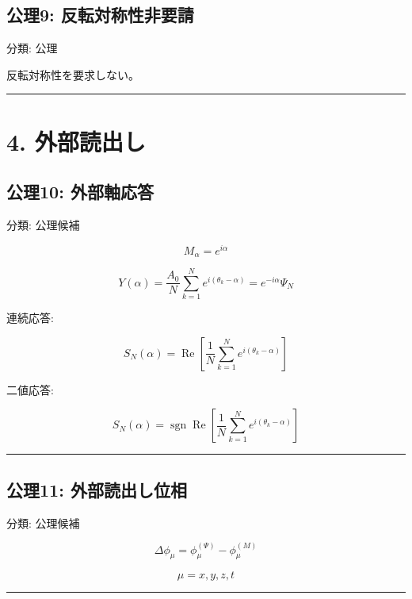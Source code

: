 \documentclass[
  a4paper,
]{ltjsarticle}
\begin{document}
\subsection{公理9:
反転対称性非要請}\label{ux516cux74069-ux53cdux8ee2ux5bfeux79f0ux6027ux975eux8981ux8acb}

分類: 公理

反転対称性を要求しない。

\begin{center}\rule{0.5\linewidth}{0.5pt}\end{center}

\section{4. 外部読出し}\label{ux5916ux90e8ux8aadux51faux3057}

\subsection{公理10:
外部軸応答}\label{ux516cux740610-ux5916ux90e8ux8ef8ux5fdcux7b54}

分類: 公理候補

\[
M_\alpha=e^{i\alpha}
\]

\[
Y(\alpha)=\frac{A_0}{N}\sum_{k=1}^{N}e^{i(\theta_k-\alpha)}
=e^{-i\alpha}\Psi_N
\]

連続応答:

\[
S_N(\alpha)=\operatorname{Re}\left[\frac{1}{N}\sum_{k=1}^{N}e^{i(\theta_k-\alpha)}\right]
\]

二値応答:

\[
S_N(\alpha)=\operatorname{sgn}\operatorname{Re}\left[\frac{1}{N}\sum_{k=1}^{N}e^{i(\theta_k-\alpha)}\right]
\]

\begin{center}\rule{0.5\linewidth}{0.5pt}\end{center}

\subsection{公理11:
外部読出し位相}\label{ux516cux740611-ux5916ux90e8ux8aadux51faux3057ux4f4dux76f8}

分類: 公理候補

\[
\Delta\phi_\mu=\phi_\mu^{(\Psi)}-\phi_\mu^{(M)}
\]

\[
\mu=x,y,z,t
\]

\begin{center}\rule{0.5\linewidth}{0.5pt}\end{center}
\end{document}
